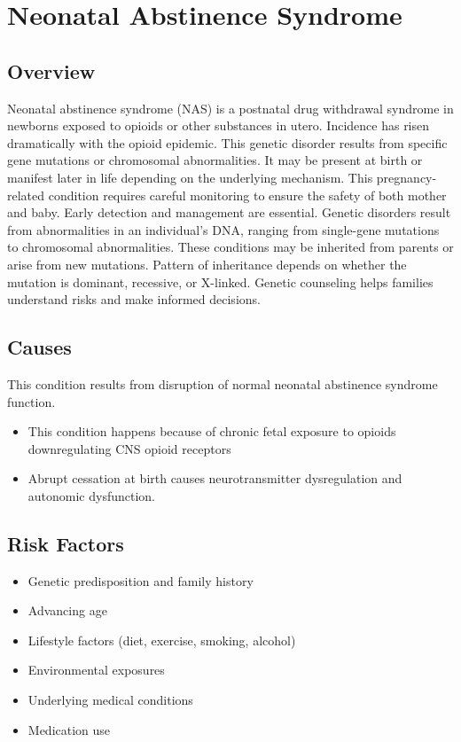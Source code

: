 \chapter{Neonatal Abstinence Syndrome}
\label{sec:Neonatal Abstinence Syndrome}

\section{Overview}
Neonatal abstinence syndrome (NAS) is a postnatal drug withdrawal syndrome in newborns exposed to opioids or other substances in utero. Incidence has risen dramatically with the opioid epidemic. This genetic disorder results from specific gene mutations or chromosomal abnormalities. It may be present at birth or manifest later in life depending on the underlying mechanism. This pregnancy-related condition requires careful monitoring to ensure the safety of both mother and baby. Early detection and management are essential. Genetic disorders result from abnormalities in an individual's DNA, ranging from single-gene mutations to chromosomal abnormalities. These conditions may be inherited from parents or arise from new mutations. Pattern of inheritance depends on whether the mutation is dominant, recessive, or X-linked. Genetic counseling helps families understand risks and make informed decisions.
\section{Causes}
This condition results from disruption of normal neonatal abstinence syndrome function.

\begin{itemize}[noitemsep]
  \item This condition happens because of chronic fetal exposure to opioids downregulating CNS opioid receptors
  \item Abrupt cessation at birth causes neurotransmitter dysregulation and autonomic dysfunction.
\end{itemize}
\section{Risk Factors}


\begin{itemize}[noitemsep]
  \item Genetic predisposition and family history
  \item Advancing age
  \item Lifestyle factors (diet, exercise, smoking, alcohol)
  \item Environmental exposures
  \item Underlying medical conditions
  \item Medication use
\end{itemize}
